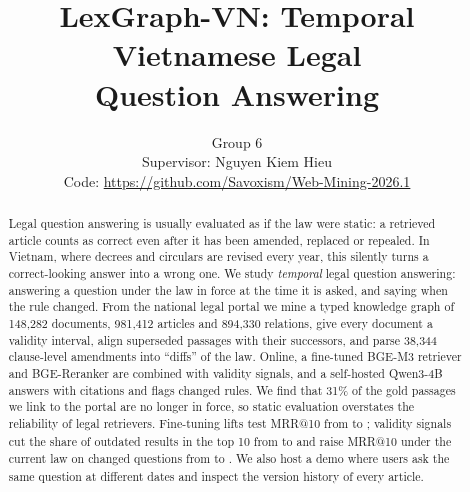 \documentclass{article} %
\title{LexGraph-VN: Temporal Vietnamese Legal \\ Question Answering}
\author{Group 6 \\
Supervisor: Nguyen Kiem Hieu \\
Code: \url{https://github.com/Savoxism/Web-Mining-2026.1}
}
\begin{document}
\maketitle
{}

\vspace{-3mm}
\begin{abstract}
\vspace{-1mm}
Legal question answering is usually evaluated as if the law were static: a retrieved article counts as correct even
after it has been amended, replaced or repealed. In Vietnam, where decrees and circulars are revised every year, this
silently turns a correct-looking answer into a wrong one. We study \emph{temporal} legal question answering: answering a
question under the law in force at the time it is asked, and saying when the rule changed. From the national legal portal
we mine a typed knowledge graph of 148,282 documents, 981,412 articles and 894,330 relations, give every document a
validity interval, align \ResAlignAccepted{} superseded passages with their successors, and parse 38,344 clause-level amendments into
``diffs'' of the law. Online, a fine-tuned BGE-M3 retriever and BGE-Reranker are combined with validity signals, and a
self-hosted Qwen3-4B answers with citations and flags changed rules. We find that 31\% of the gold passages we link to
the portal are no longer in force, so static evaluation overstates the reliability of legal retrievers. Fine-tuning lifts
test MRR@10 from \textbf{\ResZsCeMrr} to \textbf{\ResFtCeMrr}; validity signals cut the share of outdated results in the
top 10 from \textbf{\ResStaleNoTime} to \textbf{\ResStaleTime} and raise MRR@10 under the current law on changed
questions from \textbf{\ResTmrrNoTime} to \textbf{\ResTmrrTime}. We also host a demo where users ask the same question at
different dates and inspect the version history of every article.
\end{abstract}
\end{document}
